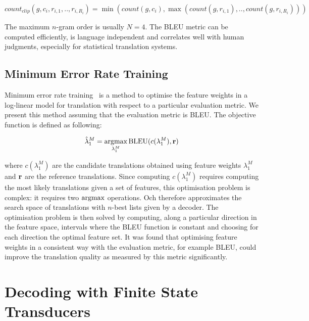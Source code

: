     \begin{equation}
      count_{clip}(g,c_i,r_{i,1},..,r_{i,R_i}) = \min(count(g,c_i),\max(count(g,r_{i,1}),..,count(g,r_{i,R_i})))
    \end{equation}

    The maximum $n$-gram order is usually $N=4$. The BLEU metric can be computed efficiently, is language
    independent and correlates well with human judgments, especially for statistical translation systems.

    \subsection{Minimum Error Rate Training}
    \label{sec:mert}

    Minimum error rate training~\citep{och:2003:ACL} is a method to optimise the feature weights
    in a log-linear model for translation with respect to a particular evaluation metric. We present
    this method assuming that the evaluation metric is BLEU. The objective function is defined 
    as following:

    \begin{equation}
      \hat{\lambda}_1^M = \operatorname*{argmax}_{\lambda_1^M} \mbox{BLEU}(c(\lambda_1^M), {\bf r}) 
    \end{equation}

    \noindent where $c(\lambda_1^M)$ are the candidate translations obtained using feature
    weights $\lambda_1^M$ and ${\bf r}$ are the reference translations. Since computing $c(\lambda_1^M)$
    requires computing the most likely translations given a set of features, this
    optimisation problem is complex: it requires two $\operatorname*{argmax}$ operations. Och therefore approximates the search space of translations
    with $n$-best lists given by a decoder. The optimisation problem is then solved by 
    computing, along a particular direction in the feature space, intervals where the BLEU function 
    is constant and choosing for each direction the optimal feature set. It was found
    that optimising feature weights in a consistent way with the evaluation metric, for example
    BLEU, could improve the translation quality as measured by this metric significantly.


\section{Decoding with Finite State Transducers}
\label{sec:hifst}
  
